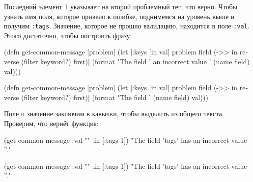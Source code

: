 \fi

Последний элемент 1 указывает на второй проблемный тег, что верно. Чтобы узнать
имя поля, которое привело к ошибке, поднимемся на уровень выше и получим
\verb|:tags|. Значение, которое не прошло валидацию, находится в поле
\verb|:val|. Этого достаточно, чтобы построить фразу:

\ifx\DEVICETYPE\MOBILE

\begin{english}
  \begin{clojure}
(defn get-common-message
  [problem]
  (let [{:keys [in val]} problem
        field (->> in
                   reverse
                   (filter keyword?)
                   first)]
    (format
      "The field '%
                an incorrect value '%
      (name field) val)))
  \end{clojure}
\end{english}

\else

\begin{english}
  \begin{clojure}
(defn get-common-message
  [problem]
  (let [{:keys [in val]} problem
        field (->> in
                   reverse
                   (filter keyword?)
                   first)]
    (format "The field '%
            (name field) val)))
  \end{clojure}
\end{english}

\fi

Поле и значение заключим в кавычки, чтобы выделить из общего текста. Проверим,
что вернёт функция:

\ifx\DEVICETYPE\MOBILE

\begin{english}
  \begin{clojure}
(get-common-message
  {:val "" :in [:tags 1]})
"The field 'tags' has
          an incorrect value ''."
  \end{clojure}
\end{english}

\else

\begin{english}
  \begin{clojure}
(get-common-message {:val "" :in [:tags 1]})
"The field 'tags' has an incorrect value ''."
  \end{clojure}
\end{english}

\fi

